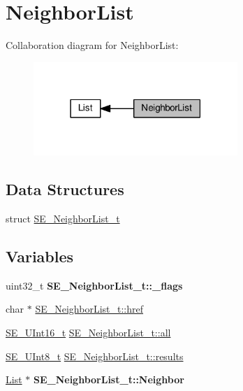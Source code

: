 \hypertarget{group__NeighborList}{}\section{Neighbor\+List}
\label{group__NeighborList}
Collaboration diagram for Neighbor\+List\+:\nopagebreak
\begin{figure}[H]
\begin{center}
\leavevmode
\includegraphics[width=219pt]{group__NeighborList}
\end{center}
\end{figure}
\subsection*{Data Structures}
\begin{DoxyCompactItemize}
\item 
struct \hyperlink{structSE__NeighborList__t}{S\+E\+\_\+\+Neighbor\+List\+\_\+t}
\end{DoxyCompactItemize}
\subsection*{Variables}
\begin{DoxyCompactItemize}
\item 
\mbox{\label{group__NeighborList_ga622815a82cf9b0697db76eee9e5d7f06}} 
uint32\+\_\+t {\bfseries S\+E\+\_\+\+Neighbor\+List\+\_\+t\+::\+\_\+flags}
\item 
char $\ast$ \hyperlink{group__NeighborList_ga971ff14701d973d68a904f70532feb2f}{S\+E\+\_\+\+Neighbor\+List\+\_\+t\+::href}
\item 
\hyperlink{group__UInt16_gac68d541f189538bfd30cfaa712d20d29}{S\+E\+\_\+\+U\+Int16\+\_\+t} \hyperlink{group__NeighborList_ga61ce4f83d73b20a324e57193fea5530a}{S\+E\+\_\+\+Neighbor\+List\+\_\+t\+::all}
\item 
\hyperlink{group__UInt8_gaf7c365a1acfe204e3a67c16ed44572f5}{S\+E\+\_\+\+U\+Int8\+\_\+t} \hyperlink{group__NeighborList_gab0040d876fb53305578656365b0cf0bd}{S\+E\+\_\+\+Neighbor\+List\+\_\+t\+::results}
\item 
\mbox{\label{group__NeighborList_ga0a87a9a73557145618dc704b298646ad}} 
\hyperlink{structList}{List} $\ast$ {\bfseries S\+E\+\_\+\+Neighbor\+List\+\_\+t\+::\+Neighbor}
\end{DoxyCompactItemize}


